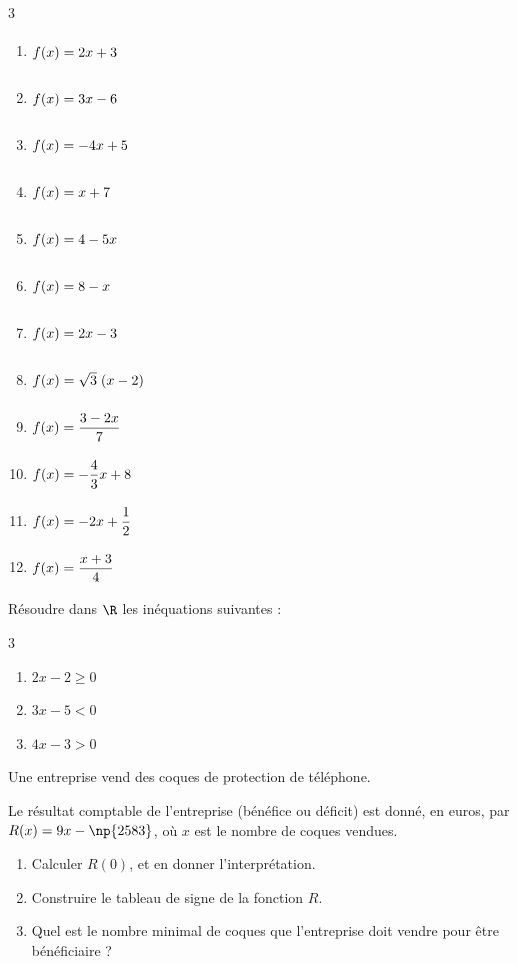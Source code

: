 \vspace{-8pt}
\setlength{\columnsep}{1cm}
\setlength{\columnseprule}{0pt}
\begin{multicols}{3}
\begin{enumerate}
\item $f(x)=2x+3\vphantom{\dfrac{h}{p}}$
\item $f(x)=3x-6\vphantom{\dfrac{h}{p}}$
\item $f(x)=-4x+5\vphantom{\dfrac{h}{p}}$
\item $f(x)=x+7\vphantom{\dfrac{h}{p}}$
\item $f(x)=4-5x\vphantom{\dfrac{h}{p}}$
\item $f(x)=8-x\vphantom{\dfrac{h}{p}}$
\item $f(x)=2x-3\vphantom{\dfrac{h}{p}}$
\item $f(x)=\sqrt{3}\;(x-2)\vphantom{\dfrac{h}{p}}$
\item $f(x)=\dfrac{3-2x}{7}\vphantom{\dfrac{h}{p}}$
\item $f(x)=-\dfrac{4}{3}x+8\vphantom{\dfrac{h}{p}}$
\item $f(x)=-2x+\dfrac{1}{2}\vphantom{\dfrac{h}{p}}$
\item $f(x)=\dfrac{x+3}{4}\vphantom{\dfrac{h}{p}}$

\end{enumerate}
\end{multicols}
\vspace{-6pt}

\exo

Résoudre dans $\R$ les inéquations suivantes :

\vspace{-8pt}
\setlength{\columnsep}{1cm}
\setlength{\columnseprule}{0pt}
\begin{multicols}{3}
\begin{enumerate}
\item $2x-2\geqslant 0$
\item $3x-5<0$
\item $4x-3>0$
\end{enumerate}
\end{multicols}

\exo

Une entreprise vend des coques de protection de téléphone.

Le résultat comptable de l'entreprise (bénéfice ou déficit) est donné, en euros, par $R(x)=9x-\np{2583}$, où $x$ est le nombre de coques vendues.
\begin{enumerate}
\item Calculer $R(0)$, et en donner l'interprétation.
\item Construire le tableau de signe de la fonction $R$.
\item Quel est le nombre minimal de coques que l'entreprise doit vendre pour être bénéficiaire ?
\end{enumerate}

